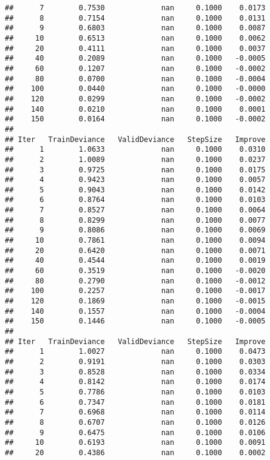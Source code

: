 \documentclass[]{article}
\begin{document}
\begin{verbatim}
##      7        0.7530             nan     0.1000    0.0173
##      8        0.7154             nan     0.1000    0.0131
##      9        0.6803             nan     0.1000    0.0087
##     10        0.6513             nan     0.1000    0.0062
##     20        0.4111             nan     0.1000    0.0037
##     40        0.2089             nan     0.1000   -0.0005
##     60        0.1207             nan     0.1000   -0.0002
##     80        0.0700             nan     0.1000   -0.0004
##    100        0.0440             nan     0.1000   -0.0000
##    120        0.0299             nan     0.1000   -0.0002
##    140        0.0210             nan     0.1000    0.0001
##    150        0.0164             nan     0.1000   -0.0002
## 
## Iter   TrainDeviance   ValidDeviance   StepSize   Improve
##      1        1.0633             nan     0.1000    0.0310
##      2        1.0089             nan     0.1000    0.0237
##      3        0.9725             nan     0.1000    0.0175
##      4        0.9423             nan     0.1000    0.0057
##      5        0.9043             nan     0.1000    0.0142
##      6        0.8764             nan     0.1000    0.0103
##      7        0.8527             nan     0.1000    0.0064
##      8        0.8299             nan     0.1000    0.0077
##      9        0.8086             nan     0.1000    0.0069
##     10        0.7861             nan     0.1000    0.0094
##     20        0.6420             nan     0.1000    0.0071
##     40        0.4544             nan     0.1000    0.0019
##     60        0.3519             nan     0.1000   -0.0020
##     80        0.2790             nan     0.1000   -0.0012
##    100        0.2257             nan     0.1000   -0.0017
##    120        0.1869             nan     0.1000   -0.0015
##    140        0.1557             nan     0.1000   -0.0004
##    150        0.1446             nan     0.1000   -0.0005
## 
## Iter   TrainDeviance   ValidDeviance   StepSize   Improve
##      1        1.0027             nan     0.1000    0.0473
##      2        0.9191             nan     0.1000    0.0303
##      3        0.8528             nan     0.1000    0.0334
##      4        0.8142             nan     0.1000    0.0174
##      5        0.7786             nan     0.1000    0.0103
##      6        0.7347             nan     0.1000    0.0181
##      7        0.6968             nan     0.1000    0.0114
##      8        0.6707             nan     0.1000    0.0126
##      9        0.6475             nan     0.1000    0.0106
##     10        0.6193             nan     0.1000    0.0091
##     20        0.4386             nan     0.1000    0.0002

\end{verbatim}
\end{document}

